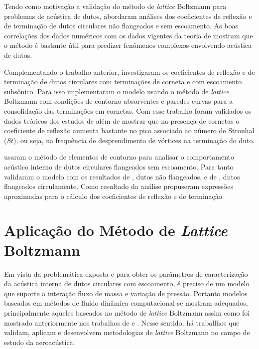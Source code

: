 Tendo como motivação a validação do método de \textit{lattice} Boltzmann para problemas de acústica de dutos,  abordaram análises dos coeficientes de reflexão e de terminação de dutos circulares não flangeados e sem escoamento. As boas correlações dos dados numéricos com os dados vigentes da teoria de  mostram que o método é bastante útil para predizer fenômenos complexos envolvendo acústica de dutos.

Complementando o trabalho anterior,  investigaram os coeficientes de reflexão e de terminação de dutos circulares com terminações de corneta e com escoamento subsônico. Para isso implementaram o modelo usando o método de \textit{lattice} Boltzmann com condições de contorno absorventes e paredes curvas para a consolidação das terminações em cornetas. Com esse trabalho foram validados os dados teóricos dos estudos de  além de mostrar que na presença de cornetas o coeficiente de reflexão aumenta bastante no pico associado ao número de Strouhal ($St$), ou seja, na frequência de desprendimento de vórtices na terminação do duto.

 usaram o método de elementos de contorno para analisar o comportamento acústico interno de dutos circulares flangeados sem escoamento. Para tanto validaram o modelo com os resultados de , dutos não flangeados, e de , dutos flangeados circulamente. Como resultado da análise propuseram expressões aproximadas para o cálculo dos coeficientes de reflexão e de terminação.

\section{Aplicação do Método de \textit{Lattice} Boltzmann}

Em vista da problemática exposta e para obter os parâmetros de caracterização da acústica interna de dutos circulares com escoamento, é preciso de um modelo que suporte a interação fluxo de massa e variação de pressão. Portanto modelos baseados em métodos de fluido dinâmica computacional se mostram adequados, principalmente aqueles baseados no método de \textit{lattice} Boltzmann assim como foi mostrado anteriormente nos trabalhos de  e . Nesse sentido, há traballhos que validam, aplicam e desenvolvem metodologias de \textit{lattice} Boltzmann no campo de estudo da aeroacústica.

